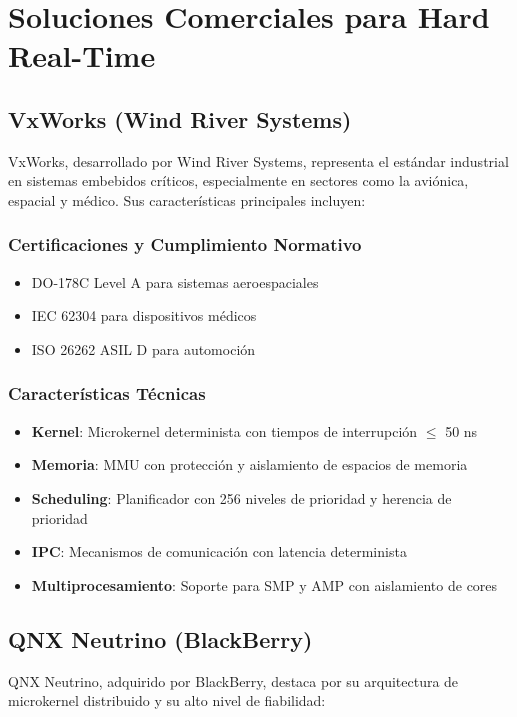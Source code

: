 \newpage
\section{Soluciones Comerciales para Hard Real-Time}

    \subsection{VxWorks (Wind River Systems)}
    VxWorks, desarrollado por Wind River Systems, representa el estándar industrial en sistemas embebidos críticos, especialmente en sectores como la aviónica, espacial y médico. Sus características principales incluyen:

        \subsubsection{Certificaciones y Cumplimiento Normativo}
        \begin{itemize}
            \item DO-178C Level A para sistemas aeroespaciales
            \item IEC 62304 para dispositivos médicos
            \item ISO 26262 ASIL D para automoción
        \end{itemize}

        \subsubsection{Características Técnicas}
        \begin{itemize}
            \item \textbf{Kernel}: Microkernel determinista con tiempos de interrupción $\le$ 50 ns
            \item \textbf{Memoria}: MMU con protección y aislamiento de espacios de memoria
            \item \textbf{Scheduling}: Planificador con 256 niveles de prioridad y herencia de prioridad
            \item \textbf{IPC}: Mecanismos de comunicación con latencia determinista
            \item \textbf{Multiprocesamiento}: Soporte para SMP y AMP con aislamiento de cores
        \end{itemize}

    \subsection{QNX Neutrino (BlackBerry)}
    QNX Neutrino, adquirido por BlackBerry, destaca por su arquitectura de microkernel distribuido y su alto nivel de fiabilidad:

